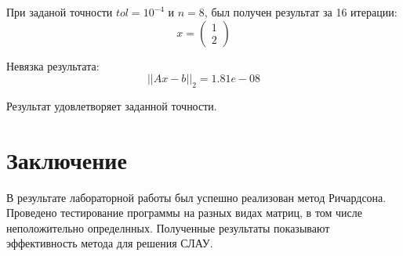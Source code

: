 \documentclass[a4paper,12pt]{article}
\begin{document}
	При заданой точности $tol=10^{-4}$ и $n=8$, был получен результат за 16 итерации:
	\[
	x = 
	\begin{pmatrix}
		1 \\ 2
	\end{pmatrix}
	\]
	
	Невязка результата:
	\[
	||Ax - b||_2 = 1.81e-08
	\]
	
	Результат удовлетворяет заданной точности.
	\newpage
	\section{Заключение}
	В результате лабораторной работы был успешно реализован метод Ричардсона. Проведено тестирование программы на разных видах матриц, в том числе неположительно определнных. Полученные результаты показывают эффективность метода для решения СЛАУ.
	\newpage
	
	
	
	
	
\end{document}
